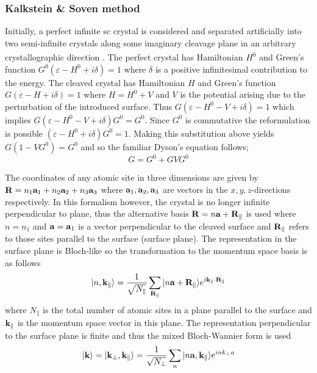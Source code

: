 \documentclass[a4paper, 12pt]{article}
\begin{document}
	\subsubsection{Kalkstein \& Soven method}\label{k_s}
	Initially, a perfect infinite \gls{sc} crystal is considered and separated artificially into two semi-infinite crystals along some imaginary cleavage plane in an arbitrary crystallographic direction\textcolor{blue}{\textsuperscript{ \cite{phan,KS}}}.
The perfect crystal has Hamiltonian $H^0$ and Green's function $G^0 (\varepsilon-H^0+i\delta)=1$ where $\delta$ is a positive infinitesimal contribution to the energy. The cleaved crystal has Hamiltonian $H$ and Green's function $G(\varepsilon-H+i\delta)=1$ where $H = H^0 + V$ and $V$ is the potential arising due to the perturbation of the introduced surface. Thus $G(\varepsilon-H^0-V+i\delta)=1$ which implies $G(\varepsilon-H^0-V+i\delta)G^0=G^0$. Since $G^0$ is commutative the reformulation is possible $(\varepsilon-H^0+i\delta)G^0=1$. Making this substitution above yields $G(1-VG^0)=G^0$ and so the familiar Dyson's equation follows; 
\begin{equation}\label{dyson}
G=G^0+GVG^0 
\end{equation}
\par The coordinates of any atomic site in three dimensions are given by ${\bf{R}} = n_1{\bf a}_1+n_2{\bf a}_2+n_3{\bf a}_3$ where ${\bf a}_1, {\bf a}_2,{\bf a}_3$ are vectors in the $x, y,z$-directions respectively. In this formalism however, the crystal is no longer infinite perpendicular to plane, thus the alternative basis ${\bf R} = n{\bf a}+{\bf R_\parallel}$ is used where $n=n_1$ and ${\bf a=a}_1$ is a vector perpendicular to the cleaved surface and $\bf R_\parallel$ refers to those sites parallel to the surface (surface plane).
The representation in the surface plane is Bloch-like so the transformation to the momentum space basis is as follows
\begin{equation}
|n,{\bf k_\parallel} \rangle = \frac{1}{\sqrt{N_\parallel}}\sum_{\bf R_\parallel} |n{\bf a} + {\bf R_\parallel}\rangle e^{i\bf k_\parallel\cdot R_\parallel}
\end{equation}
where $N_\parallel$ is the total number of atomic sites in a plane parallel to the surface and ${\bf k}_\parallel$ is the momentum space vector in this plane.
The representation perpendicular to the surface plane is finite and thus the mixed Bloch-Wannier form is used
\begin{equation}
	|{\bf k} \rangle =|{\bf k_\perp,k_\parallel}\rangle = \frac{1}{\sqrt{N_\perp}}\sum_n |n{\bf a,k_\parallel}\rangle e^{in{{k}}_\perp a}
\end{equation}
\end{document}
